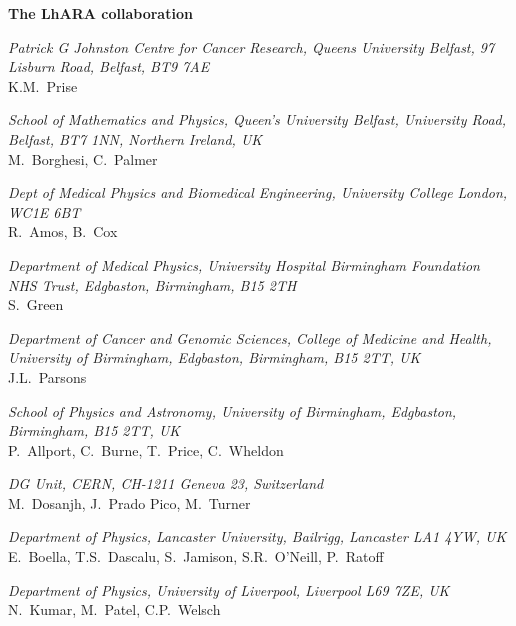 \vspace{0.75cm}
\begin{center}
  {\bf \color{BlueViolet} The LhARA collaboration} \\
  \vspace{0.25cm}
\end{center}
\noindent \textit{Patrick G Johnston Centre for Cancer Research, Queens University Belfast, 97 Lisburn Road, Belfast, BT9 7AE} \\
K.M.~Prise
 
\vspace{0.5cm}
\noindent \textit{School of Mathematics and Physics, Queen's University Belfast, University Road, Belfast, BT7 1NN, Northern Ireland, UK} \\
M.~Borghesi, C.~Palmer
 
\vspace{0.5cm}
\noindent \textit{Dept of Medical Physics and Biomedical Engineering, University College London, WC1E 6BT} \\
R.~Amos, B.~Cox
 
\vspace{0.5cm}
\noindent \textit{Department of Medical Physics, University Hospital Birmingham Foundation NHS Trust, Edgbaston, Birmingham, B15 2TH} \\
S.~Green
 
\vspace{0.5cm}
\noindent \textit{Department of Cancer and Genomic Sciences, College of Medicine and Health, University of Birmingham, Edgbaston, Birmingham, B15 2TT, UK} \\
J.L.~Parsons
 
\vspace{0.5cm}
\noindent \textit{School of Physics and Astronomy, University of Birmingham, Edgbaston, Birmingham, B15 2TT, UK} \\
P.~Allport, C.~Burne, T.~Price, C.~Wheldon
 
\vspace{0.5cm}
\noindent \textit{DG Unit, CERN, CH-1211 Geneva 23, Switzerland} \\
M.~Dosanjh, J.~Prado Pico, M.~Turner
 
\vspace{0.5cm}
\noindent \textit{Department of Physics, Lancaster University, Bailrigg, Lancaster LA1 4YW, UK} \\
E.~Boella, T.S.~Dascalu, S.~Jamison, S.R.~O'Neill, P.~Ratoff
 
\vspace{0.5cm}
\noindent \textit{Department of Physics, University of Liverpool, Liverpool L69 7ZE, UK} \\
N.~Kumar, M.~Patel, C.P.~Welsch
 
